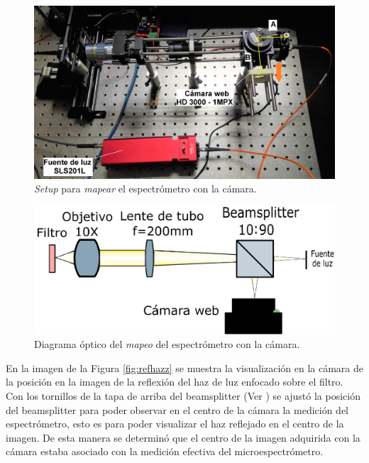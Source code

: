 \begin{figure}[H]
	\centering
	\includegraphics[width=1.0\textwidth]{Figs/microespectrometro/mapespeccam.jpg}
	\caption{\textit{Setup} para \textit{mapear} el espectrómetro con la cámara.}
	\label{fig:modmanualcam}
\end{figure}

\begin{figure}[H]
	\centering
	\includegraphics[width=1.0\textwidth]{Figs/microespectrometro/diagopticomapcamspec.png}
	\caption{Diagrama óptico del \textit{mapeo} del espectrómetro con la cámara.}
	\label{fig:caminmapp}
\end{figure}

 En la imagen de la Figura \ref{fig:refhazz} se muestra la visualización en la cámara de la posición en la imagen de la reflexión del haz de luz enfocado sobre el filtro. Con los tornillos de la tapa de arriba del beamsplitter (Ver \href{https://www.thorlabs.com/images/TabImages/Kinematic\_Cube\_Platform\_A1-780.jpg}{\faImage}) se ajustó la posición del beamsplitter para poder observar en el centro de la cámara la medición del espectrómetro, esto es para poder visualizar el haz reflejado en el centro de la imagen. De esta manera se determinó que el centro de la imagen adquirida con la cámara estaba asociado con la medición efectiva del microespectrómetro.

